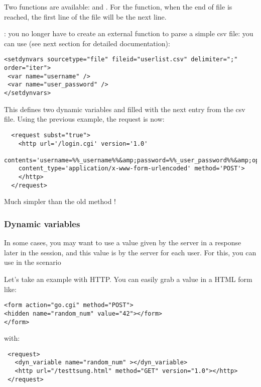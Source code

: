 \documentclass{IDXDOC-en}
\begin{document}
Two functions are available: 
and . For the
 function, when the end of file is reached, the
first line of the file will be the next line.

: you no longer have to create an external
function to parse a simple csv file: you can use 
(see next section for detailed documentation):

\begin{Verbatim}
<setdynvars sourcetype="file" fileid="userlist.csv" delimiter=";" order="iter">
 <var name="username" />
 <var name="user_password" />
</setdynvars>
\end{Verbatim}

This defines two dynamic variables  and
 filled with the next entry from the csv
file. Using the previous example, the request is now:
\begin{Verbatim}
  <request subst="true">
    <http url='/login.cgi' version='1.0'
      contents='username=%%_username%%&amp;password=%%_user_password%%&amp;op=login'
    content_type='application/x-www-form-urlencoded' method='POST'>
    </http>
  </request>
\end{Verbatim}

Much simpler than the old method !

\subsubsection{Dynamic variables}

In some cases, you may want to use a value given by the server in a
response later in the session, and this value is  by the server for each user. For this, you can use
 in the scenario

Let's take an example with HTTP. You can easily grab a value in a HTML
form like:
\begin{Verbatim}
<form action="go.cgi" method="POST">
<hidden name="random_num" value="42"></form>
</form>
\end{Verbatim}

with:
\begin{Verbatim}
 <request>
   <dyn_variable name="random_num" ></dyn_variable>
   <http url="/testtsung.html" method="GET" version="1.0"></http>
 </request>
\end{Verbatim}
\end{document}
